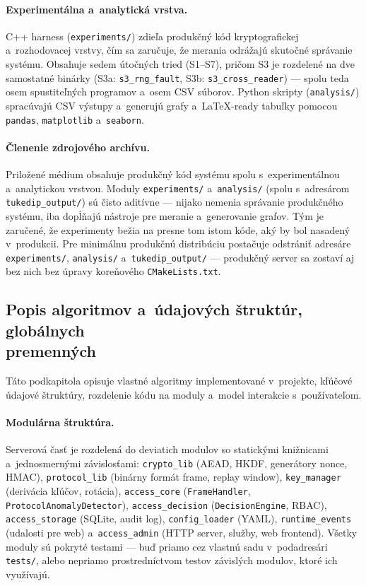 \documentclass[a4paper]{feidipsp}
\begin{document}
\paragraph{Experimentálna a~analytická vrstva.} C++ harness (\texttt{experiments/}) zdieľa produkčný kód kryptografickej a~rozhodovacej vrstvy, čím sa zaručuje, že merania odrážajú skutočné správanie systému. Obsahuje sedem útočných tried (S1--S7), pričom S3 je rozdelené na dve samostatné binárky (S3a: \texttt{s3\_rng\_fault}, S3b: \texttt{s3\_cross\_reader}) --- spolu teda osem spustiteľných programov a~osem CSV súborov. Python skripty (\texttt{analysis/}) spracúvajú CSV výstupy a~generujú grafy a~LaTeX-ready tabuľky pomocou \texttt{pandas}, \texttt{matplotlib} a~\texttt{seaborn}.

\paragraph{Členenie zdrojového archívu.} Priložené médium obsahuje produkčný kód systému spolu s~experimentálnou a~analytickou vrstvou. Moduly \texttt{experiments/} a~\texttt{analysis/} (spolu s~adresárom \texttt{tukedip\_output/}) sú čisto aditívne --- nijako nemenia správanie produkčného systému, iba dopĺňajú nástroje pre meranie a~generovanie grafov. Tým je zaručené, že experimenty bežia na presne tom istom kóde, aký by bol nasadený v~produkcii. Pre minimálnu produkčnú distribúciu postačuje odstrániť adresáre \texttt{experiments/}, \texttt{analysis/} a~\texttt{tukedip\_output/} --- produkčný server sa zostaví aj bez nich bez úpravy koreňového \texttt{CMakeLists.txt}.

\subsection[Popis algoritmov a~údajových štruktúr, globálnych premenných]{Popis algoritmov a~údajových štruktúr, globálnych\\ premenných}

Táto podkapitola opisuje vlastné algoritmy implementované v~projekte, kľúčové údajové štruktúry, rozdelenie kódu na moduly a~model interakcie s~používateľom.

\paragraph{Modulárna štruktúra.}

Serverová časť je rozdelená do deviatich modulov so statickými knižnicami a~jednosmernými závislosťami: \texttt{crypto\_lib} (AEAD, HKDF, generátory nonce, HMAC), \texttt{protocol\_lib} (binárny formát frame, replay window), \texttt{key\_manager} (derivácia kľúčov, rotácia), \texttt{access\_core} (\texttt{FrameHandler}, \texttt{ProtocolAnomalyDetector}), \texttt{access\_decision} (\texttt{DecisionEngine}, RBAC), \texttt{access\_storage} (SQLite, audit log), \texttt{config\_loader} (YAML), \texttt{runtime\_events} (udalosti pre web) a~\texttt{access\_admin} (HTTP server, služby, web frontend). Všetky moduly sú pokryté testami --- buď priamo cez vlastnú sadu v~podadresári \texttt{tests/}, alebo nepriamo prostredníctvom testov závislých modulov, ktoré ich využívajú.
\end{document}
